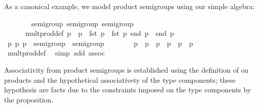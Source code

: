 \begin{isabellebody}
\begin{isamarkuptext}
  As a canonical example, we model product semigroups
  using our simple algebra:%
\end{isamarkuptext}%
\isamarkuptrue%
\ \ \ \ \isamarkupfalse%
\ {\isacharasterisk}\ {\isacharcolon}{\isacharcolon}\ {\isacharparenleft}semigroup{\isacharcomma}\ semigroup{\isacharparenright}\ semigroup\isanewline
\ \ \ \ \isanewline
\isanewline
\ \ \ \ \isamarkupfalse%
\isanewline
\ \ \ \ \ \ mult{\isacharunderscore}prod{\isacharunderscore}def{\isacharcolon}\ {\isachardoublequoteopen}p\ {\isasymotimes}\ p\ {\isacharequal}\ {\isacharparenleft}fst\ p\ {\isasymotimes}\ fst\ p\ snd\ p\ {\isasymotimes}\ snd\ p\isanewline
\isanewline
\ \ \ \ \isamarkupfalse%
%
\isadelimproof
\ %
\endisadelimproof
%
\isatagproof
{}\isamarkupfalse%
\isanewline
\ \ \ \ \ \ \isamarkupfalse%
\ p\ p\ p\ {\isacharcolon}{\isacharcolon}\ {\isachardoublequoteopen}{\isasymalpha}{\isasymColon}semigroup\ {\isasymtimes}\ {\isasymbeta}{\isasymColon}semigroup{\isachardoublequoteclose}\isanewline
\ \ \ \ \ \ \isamarkupfalse%
\ {\isachardoublequoteopen}p\ {\isasymotimes}\ p\ {\isasymotimes}\ p\ {\isacharequal}\ p\ {\isasymotimes}\ {\isacharparenleft}p\ {\isasymotimes}\ p\isanewline
\ \ \ \ \ \ \ \ \isamarkupfalse%
\ mult{\isacharunderscore}prod{\isacharunderscore}def\ \isamarkupfalse%
\ {\isacharparenleft}simp\ add{\isacharcolon}\ assoc{\isacharparenright}\isanewline
\ \ \ \ \isamarkupfalse%
%
\endisatagproof
{\isafoldproof}%
%
\isadelimproof
%
\endisadelimproof
\ \ \ \ \ \ \isanewline
\isanewline
\ \ \ \ \isamarkupfalse%
%
\begin{isamarkuptext}%
\noindent Associativity from product semigroups is
  established using
  the definition of \isa{{\isasymotimes}} on products and the hypothetical
  associativety of the type components;  these hypothesis
  are facts due to the  constraints imposed
  on the type components by the  proposition.

\end{isamarkuptext}
\end{isabellebody}
